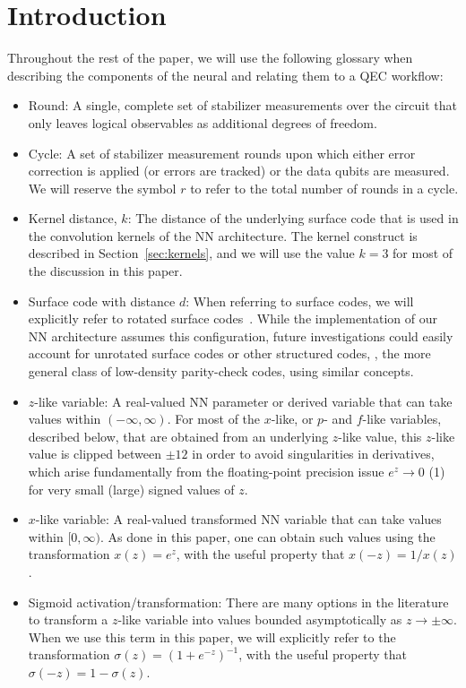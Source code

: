 \section{Introduction}



Throughout the rest of the paper, we will use the following glossary when describing the components of the neural and relating them to a QEC workflow:
\begin{itemize}
\item Round: A single, complete set of stabilizer measurements over the circuit that only leaves logical observables as additional degrees of freedom.
\item Cycle: A set of stabilizer measurement rounds upon which either error correction is applied (or errors are tracked) or the data qubits are measured. We will reserve the symbol $r$ to refer to the total number of rounds in a cycle.
\item Kernel distance, $k$: The distance of the underlying surface code that is used in the convolution kernels of the NN architecture. The kernel construct is described in Section~\ref{sec:kernels}, and we will use the value $k=3$ for most of the discussion in this paper.
\item Surface code with distance $d$: When referring to surface codes, we will explicitly refer to rotated surface codes~\cite{Bombin:2007}. While the implementation of our NN architecture assumes this configuration, future investigations could easily account for unrotated surface codes or other structured codes, \eg, the more general class of low-density parity-check codes, using similar concepts.
\item $z$-like variable: A real-valued NN parameter or derived variable that can take values within $(-\infty, \infty)$. For most of the $x$-like, or $p$- and $f$-like variables, described below, that are obtained from an underlying $z$-like value, this $z$-like value is clipped between $\pm12$ in order to avoid singularities in derivatives, which arise fundamentally from the floating-point precision issue $e^z \to 0$ (1) for very small (large) signed values of $z$.
\item $x$-like variable: A real-valued transformed NN variable that can take values within $[0, \infty)$. As done in this paper, one can obtain such values using the transformation $x(z)=e^z$, with the useful property that $x(-z)=1/x(z)$.
\item Sigmoid activation/transformation: There are many options in the literature to transform a $z$-like variable into values bounded asymptotically as $z \to \pm \infty$. When we use this term in this paper, we will explicitly refer to the transformation $\sigma(z)=\left(1+e^{-z}\right)^{-1}$, with the useful property that $\sigma(-z)=1-\sigma(z)$.

\end{itemize}

